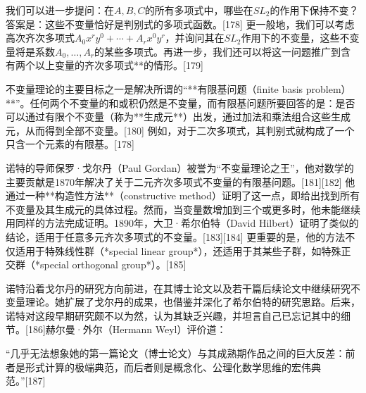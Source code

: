 我们可以进一步提问：在$ A, B, C$的所有多项式中，哪些在$ SL_2$的作用下保持不变？答案是：这些不变量恰好是判别式的多项式函数。[178] 更一般地，我们可以考虑高次齐次多项式$A_0 x^r y^0 + \cdots + A_r x^0 y^r$，并询问其在$SL_2$作用下的不变量，这些不变量将是系数$A_0, \ldots, A_r$的某些多项式。再进一步，我们还可以将这一问题推广到含有两个以上变量的齐次多项式**的情形。[179]

不变量理论的主要目标之一是解决所谓的“**有限基问题（finite basis problem）**”。任何两个不变量的和或积仍然是不变量，而有限基问题所要回答的是：是否可以通过有限个不变量（称为**生成元**）出发，通过加法和乘法组合这些生成元，从而得到全部不变量。[180] 例如，对于二次多项式，其判别式就构成了一个只含一个元素的有限基。[178]

诺特的导师保罗·戈尔丹（Paul Gordan）被誉为“不变量理论之王”，他对数学的主要贡献是1870年解决了关于二元齐次多项式不变量的有限基问题。[181][182] 他通过一种**构造性方法**（constructive method）证明了这一点，即给出找到所有不变量及其生成元的具体过程。然而，当变量数增加到三个或更多时，他未能继续用同样的方法完成证明。1890年，大卫·希尔伯特（David Hilbert）证明了类似的结论，适用于任意多元齐次多项式的不变量。[183][184] 更重要的是，他的方法不仅适用于特殊线性群（*special linear group*），还适用于其某些子群，如特殊正交群（*special orthogonal group*）。[185]

诺特沿着戈尔丹的研究方向前进，在其博士论文以及若干篇后续论文中继续研究不变量理论。她扩展了戈尔丹的成果，也借鉴并深化了希尔伯特的研究思路。后来，诺特对这段早期研究颇不以为然，认为其缺乏兴趣，并坦言自己已忘记其中的细节。[186]赫尔曼·外尔（Hermann Weyl）评价道：

“几乎无法想象她的第一篇论文（博士论文）与其成熟期作品之间的巨大反差：前者是形式计算的极端典范，而后者则是概念化、公理化数学思维的宏伟典范。”[187]
